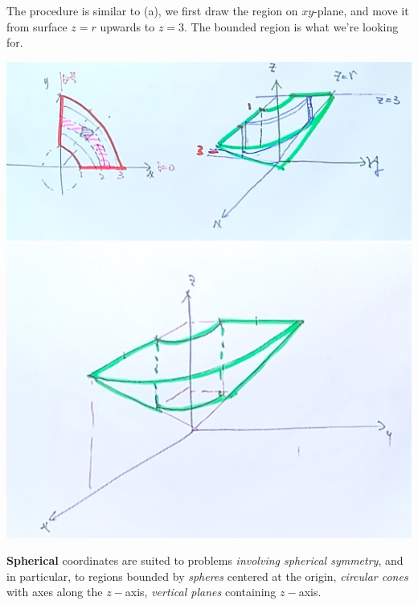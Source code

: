 \documentclass[11pt, a4paper]{MATH2023}
\begin{document}
\begin{spacing}{1.3}
    The procedure is similar to (a), we first draw the region on $xy$-plane, and 
    move it from surface $z=r$ upwards to $z=3$. The bounded region is what we're looking for.
    \begin{center}
        \includegraphics[scale=0.16]{images/Ch14-int-cylind-eg3-1.JPG}
        \includegraphics[scale=0.1]{images/Ch14-int-cylind-eg3-2.JPG}
    \end{center}
    

    \vspace{0.5in}
    {\bf Spherical} coordinates are suited to problems {\it involving spherical symmetry}, 
    and in particular, to regions bounded by {\it spheres} centered at the origin, {\it circular 
    cones} with axes along the $z-$axis, {\it vertical planes} containing $z-$axis.


\end{spacing}
\end{document}
